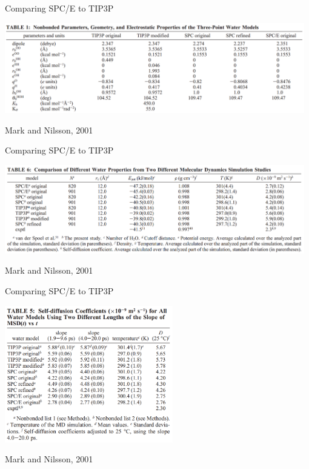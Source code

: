 \documentclass{beamer}
\begin{document}
\begin{frame}{Comparing SPC/E to TIP3P}
    \begin{center}
    \includegraphics[width=0.98\textwidth]{images/watercomp_params.png}
    \end{center}
{\footnotesize Mark and Nilsson, 2001}
\end{frame}
\begin{frame}{Comparing SPC/E to TIP3P}
    \begin{center}
    \includegraphics[width=0.98\textwidth]{images/watercomp_props.png}
    \end{center}
{\footnotesize Mark and Nilsson, 2001}
\end{frame}
\begin{frame}{Comparing SPC/E to TIP3P}
    \begin{center}
    \includegraphics[width=0.55\textwidth]{images/watercomp_selfdiff.png}
    \end{center}
{\footnotesize Mark and Nilsson, 2001}
\end{frame}
\end{document}
